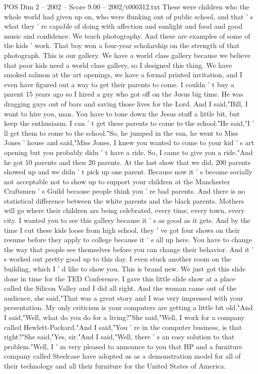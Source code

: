 \begin{textsample}{POS Dim 2 – 2002 – Score 9.00 – 2002/t000312.txt}
These were children who the whole world had given up on, who were flunking out of public school, and that ' s what they ' re capable of doing with affection and sunlight and food and good music and confidence.
We teach photography.
And these are examples of some of the kids ' work.
That boy won a four-year scholarship on the strength of that photograph.
This is our gallery.
We have a world class gallery because we believe that poor kids need a world class gallery, so I designed this thing.
We have smoked salmon at the art openings, we have a formal printed invitation, and I even have figured out a way to get their parents to come.
I couldn ' t buy a parent 15 years ago so I hired a guy who got off on the Jesus big time.
He was dragging guys out of bars and saving those lives for the Lord.
And I said,"Bill, I want to hire you, man.
You have to tone down the Jesus stuff a little bit, but keep the enthusiasm.
I can ' t get these parents to come to the school."He said,"I ' ll get them to come to the school."So, he jumped in the van, he went to Miss Jones ' house and said,"Miss Jones, I knew you wanted to come to your kid ' s art opening but you probably didn ' t have a ride.
So, I came to give you a ride."And he got 10 parents and then 20 parents.
At the last show that we did, 200 parents showed up and we didn ' t pick up one parent.
Because now it ' s become socially not acceptable not to show up to support your children at the Manchester Craftsmen ' s Guild because people think you ' re bad parents.
And there is no statistical difference between the white parents and the black parents.
Mothers will go where their children are being celebrated, every time, every town, every city.
I wanted you to see this gallery because it ' s as good as it gets.
And by the time I cut these kids loose from high school, they ' ve got four shows on their resume before they apply to college because it ' s all up here.
You have to change the way that people see themselves before you can change their behavior.
And it ' s worked out pretty good up to this day.
I even stuck another room on the building, which I ' d like to show you.
This is brand new.
We just got this slide done in time for the TED Conference.
I gave this little slide show at a place called the Silicon Valley and I did all right.
And the woman came out of the audience, she said,"That was a great story and I was very impressed with your presentation.
My only criticism is your computers are getting a little bit old."And I said,"Well, what do you do for a living?"She said,"Well, I work for a company called Hewlett-Packard."And I said,"You ' re in the computer business, is that right?"She said,"Yes, sir."And I said,"Well, there ' s an easy solution to that problem."Well, I ' m very pleased to announce to you that HP and a furniture company called Steelcase have adopted us as a demonstration model for all of their technology and all their furniture for the United States of America.

\end{textsample}
